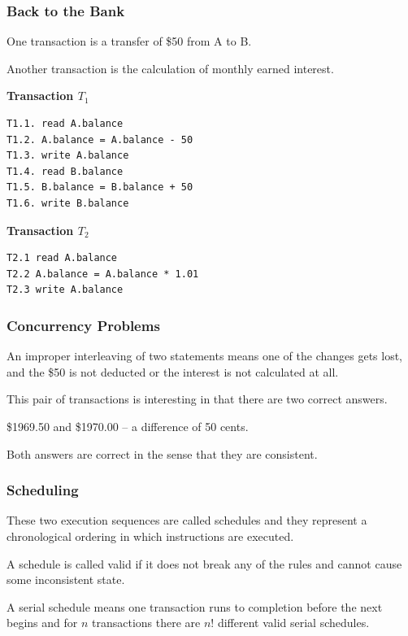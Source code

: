 \begin{frame}[fragile]
\frametitle{Back to the Bank}

One transaction is a transfer of \$50 from A to B.

Another transaction is the calculation of monthly earned interest.

{\scriptsize
\begin{multicols}{2}
\textbf{Transaction $T_{1}$}
\begin{verbatim}
T1.1. read A.balance
T1.2. A.balance = A.balance - 50
T1.3. write A.balance
T1.4. read B.balance
T1.5. B.balance = B.balance + 50
T1.6. write B.balance
\end{verbatim}
\columnbreak
\textbf{Transaction $T_{2}$}

\begin{verbatim}
T2.1 read A.balance
T2.2 A.balance = A.balance * 1.01
T2.3 write A.balance
\end{verbatim}

\end{multicols}
}

\end{frame}


\begin{frame}
\frametitle{Concurrency Problems}

 An improper interleaving of two statements means one of the changes gets lost, and the \$50 is not deducted or the interest is not calculated at all. 
 
This pair of transactions is interesting in that there are two correct answers. 
 
\$1969.50 and \$1970.00 -- a difference of 50 cents.

Both answers are correct in the sense that they are consistent.

\end{frame}

\begin{frame}
\frametitle{Scheduling}

These two execution sequences are called \alert{schedules} and they represent a chronological ordering in which instructions are executed.

A schedule is called valid if it does not break any of the rules and cannot cause some inconsistent state.

 A serial schedule means one transaction runs to completion before the next begins and for $n$ transactions there are $n!$ different valid serial schedules. 


\end{frame}

